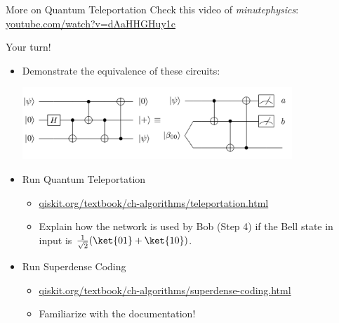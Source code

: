 \begin{frame}{More on Quantum Teleportation}
Check this video of \emph{minutephysics}: \url{youtube.com/watch?v=dAaHHGHuy1c}
\end{frame}

\begin{frame}{Your turn!}
\begin{itemize}
    \item Demonstrate the equivalence of these circuits:
    \begin{center}
        \includegraphics[width=0.80\textwidth]{img/Other-teleportation.png}
    \end{center}
    \item Run Quantum Teleportation
    \begin{itemize}
        \item \url{qiskit.org/textbook/ch-algorithms/teleportation.html}
        \item Explain how the network is used by Bob (Step 4) if the Bell state in input is $\frac{1}{\sqrt{2}}(\ket{01}+\ket{10})$.
    \end{itemize}
    \item Run Superdense Coding
    \begin{itemize}
        \item \url{qiskit.org/textbook/ch-algorithms/superdense-coding.html}
        \item Familiarize with the documentation!
    \end{itemize}
\end{itemize}

\end{frame}